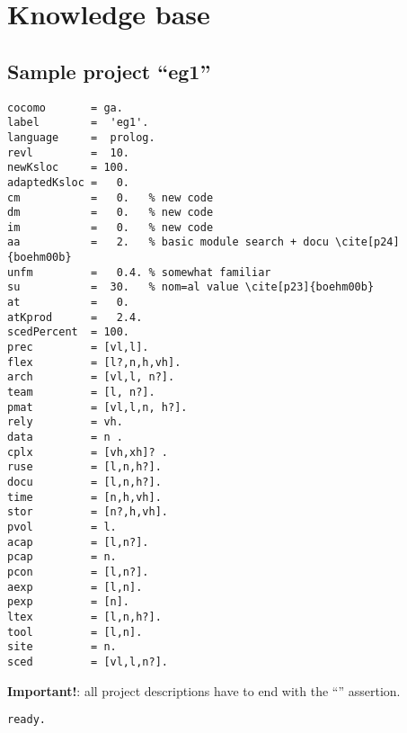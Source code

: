 \section{ Knowledge base
}
\subsection{ Sample project ``eg1''
}
\begin{Verbatim}
cocomo       = ga.
label        =  'eg1'.
language     =  prolog.
revl         =  10.
newKsloc     = 100.
adaptedKsloc =   0.
cm           =   0.   % new code
dm           =   0.   % new code
im           =   0.   % new code
aa           =   2.   % basic module search + docu \cite[p24]{boehm00b}
unfm         =   0.4. % somewhat familiar
su           =  30.   % nom=al value \cite[p23]{boehm00b}
at           =   0.
atKprod      =   2.4.
scedPercent  = 100.
prec         = [vl,l].
flex         = [l?,n,h,vh].
arch         = [vl,l, n?].
team         = [l, n?]. 
pmat         = [vl,l,n, h?].
rely         = vh.      
data         = n .
cplx         = [vh,xh]? .   
ruse         = [l,n,h?].
docu         = [l,n,h?].
time         = [n,h,vh].
stor         = [n?,h,vh].  
pvol         = l.       
acap         = [l,n?].
pcap         = n.	
pcon         = [l,n?].     
aexp         = [l,n].
pexp         = [n].
ltex         = [l,n,h?].   
tool         = [l,n].     
site         = n.       
sced         = [vl,l,n?].
\end{Verbatim}
{\bf Important!}: all project descriptions
have to end with the ``'' assertion.
\begin{Verbatim}
ready.
\end{Verbatim}

